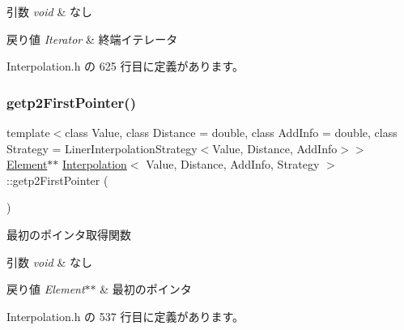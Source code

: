 \begin{DoxyParams}{引数}
{\em void} & なし \\
\hline
\end{DoxyParams}

\begin{DoxyRetVals}{戻り値}
{\em Iterator} & 終端イテレータ \\
\hline
\end{DoxyRetVals}


 Interpolation.\+h の 625 行目に定義があります。

\mbox{\label{class_interpolation_a1562562e0809978e58ec0703f383174b}} 
\subsubsection{\texorpdfstring{getp2\+First\+Pointer()}{getp2FirstPointer()}}
{\footnotesize\ttfamily template$<$class Value, class Distance = double, class Add\+Info = double, class Strategy = Liner\+Interpolation\+Strategy$<$\+Value, Distance, Add\+Info$>$$>$ \\
\mbox{\hyperlink{class_interpolation_a01e71544809483d7a2ee72fe0007bcb0}{Element}}$\ast$$\ast$ \mbox{\hyperlink{class_interpolation}{Interpolation}}$<$ Value, Distance, Add\+Info, Strategy $>$\+::getp2\+First\+Pointer (\begin{DoxyParamCaption}{ }\end{DoxyParamCaption})\hspace{0.3cm}{\ttfamily [inline]}}



最初のポインタ取得関数 


\begin{DoxyParams}{引数}
{\em void} & なし \\
\hline
\end{DoxyParams}

\begin{DoxyRetVals}{戻り値}
{\em Element$\ast$$\ast$} & 最初のポインタ \\
\hline
\end{DoxyRetVals}


 Interpolation.\+h の 537 行目に定義があります。

\mbox{\label{class_interpolation_afdf10ef9db1671ac8df2ef3b6add234f}} 
